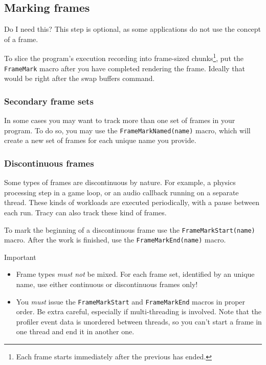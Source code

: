 \documentclass[hidelinks,titlepage,a4paper]{article}
\begin{document}
\subsection{Marking frames}
\label{markingframes}

\begin{bclogo}[
noborder=true,
couleur=black!5,
logo=\bclampe
]{Do I need this?}
This step is optional, as some applications do not use the concept of a frame.
\end{bclogo}

To slice the program's execution recording into frame-sized chunks\footnote{Each frame starts immediately after the previous has ended.}, put the \texttt{FrameMark} macro after you have completed rendering the frame. Ideally that would be right after the swap buffers command.

\subsubsection{Secondary frame sets}

In some cases you may want to track more than one set of frames in your program. To do so, you may use the \texttt{FrameMarkNamed(name)} macro, which will create a new set of frames for each unique name you provide.

\subsubsection{Discontinuous frames}

Some types of frames are discontinuous by nature. For example, a physics processing step in a game loop, or an audio callback running on a separate thread. These kinds of workloads are executed periodically, with a pause between each run. Tracy can also track these kind of frames.

To mark the beginning of a discontinuous frame use the \texttt{FrameMarkStart(name)} macro. After the work is finished, use the \texttt{FrameMarkEnd(name)} macro.

\begin{bclogo}[
noborder=true,
couleur=black!5,
logo=\bcbombe
]{Important}
\begin{itemize}
\item Frame types \emph{must not} be mixed. For each frame set, identified by an unique name, use either continuous or discontinuous frames only!
\item You \emph{must} issue the \texttt{FrameMarkStart} and \texttt{FrameMarkEnd} macros in proper order. Be extra careful, especially if multi-threading is involved. Note that the profiler event data is unordered between threads, so you can't start a frame in one thread and end it in another one.
\end{itemize}
\end{bclogo}
\end{document}
